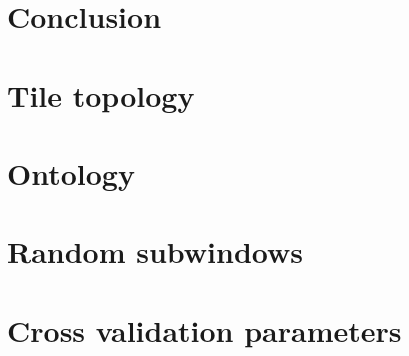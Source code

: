 \documentclass[a4paper,12pt]{report}
\begin{document}
	\chapter{Conclusion}
	
	
	\appendix
	
	\chapter{Tile topology}
	
	\newpage
	
	\chapter{Ontology}
	
	\newpage
	
	\chapter{Random subwindows}
	
	\newpage
	
	\chapter{Cross validation parameters}
	
	\newpage
	


	\listoftables
	
	\listoffigures
	
	\printbibliography[heading=bibintoc]
\end{document}
